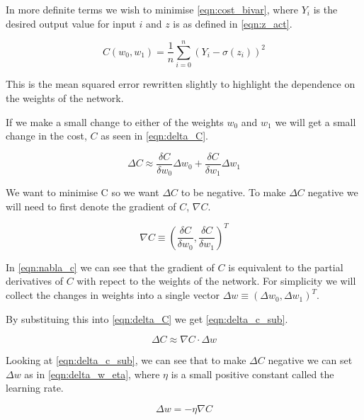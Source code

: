 In more definite terms we wish to minimise \autoref{eqn:cost_bivar}, where $Y_i$ is the desired output value for input $i$ and $z$ is as defined in \autoref{eqn:z_act}.

\begin{equation} \label{eqn:cost_bivar}
C(w_0, w_1) = \frac{1}{n}\sum_{i=0}^{n} (Y_i - \sigma(z_i))^2
\end{equation}

This is the mean squared error rewritten slightly to highlight the dependence on the weights of the network.

If we make a small change to either of the weights $w_0$ and $w_1$ we will get a small change in the cost, $C$ as seen in \autoref{eqn:delta_C}.

\begin{equation} \label{eqn:delta_C}
\Delta C \approx \frac{\delta C}{\delta w_0} \Delta w_0 + \frac{\delta C}{\delta w_1} \Delta w_1
\end{equation}

We want to minimise C so we want $\Delta C$ to be negative. To make $\Delta C$ negative we will need to first denote the gradient of $C$, $\nabla C$. 

\begin{equation} \label{eqn:nabla_c}
\nabla C \equiv (\frac{\delta C}{\delta w_0}, \frac{\delta C}{\delta w_1})^T
\end{equation}

In \autoref{eqn:nabla_c} we can see that the gradient of $C$ is equivalent to the partial derivatives of $C$ with repect to the weights of the network. For simplicity we will collect the changes in weights into a single vector $\Delta w \equiv (\Delta w_0, \Delta w_1)^T$.

By substituing this into \autoref{eqn:delta_C} we get \autoref{eqn:delta_c_sub}.

\begin{equation} \label{eqn:delta_c_sub}
\Delta C \approx \nabla C \cdot \Delta w 
\end{equation}

Looking at \autoref{eqn:delta_c_sub}, we can see that to make $\Delta C$ negative we can set $\Delta w$ as in \autoref{eqn:delta_w_eta}, where $\eta$ is a small positive constant called the learning rate.

\begin{equation} \label{eqn:delta_w_eta}
\Delta w = -\eta \nabla C
\end{equation}

